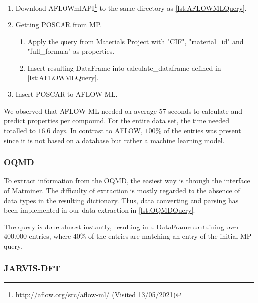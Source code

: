 \begin{enumerate}
  \item Download AFLOWmlAPI\footnote{http://aflow.org/src/aflow-ml/ (Visited 13/05/2021)} to the same directory as  \autoref{lst:AFLOWMLQuery}.
  \item Getting POSCAR from MP.
  \begin{enumerate}
    \item Apply the query from Materials Project with "CIF", "material\_id" and "full\_formula" as properties.
    \item Insert resulting DataFrame into calculate\_dataframe defined in \autoref{lst:AFLOWMLQuery}.
  \end{enumerate}
    \item Insert POSCAR to AFLOW-ML.
\end{enumerate}


\noindent We observed that AFLOW-ML needed on average $57$ seconds to calculate and predict properties per compound. For the entire data set, the time needed totalled to $16.6$ days. In contrast to AFLOW, $100\%$ of the entries was present since it is not based on a database but rather a machine learning model.

\subsubsection{OQMD}

To extract information from the OQMD, the easiest way is through the interface of Matminer. The difficulty of extraction is mostly regarded to the absence of data types in the resulting dictionary. Thus, data converting and parsing has been implemented in our data extraction in \autoref{lst:OQMDQuery}.

The query is done almost instantly, resulting in a DataFrame containing over $400.000$ entries, where $40$\% of the entries are matching an entry of the initial MP query.



\subsubsection{JARVIS-DFT}

